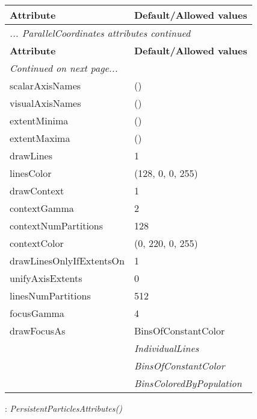\documentclass[10pt,a4paper]{report}
\begin{document}
\begin{longtable}{ll}
{\bf Attribute} & {\bf Default/Allowed values} \\
\hline \hline
\endfirsthead
\multicolumn{2}{l}{{\it ... ParallelCoordinates attributes continued}} \\
{\bf Attribute} & {\bf Default/Allowed values} \\
\hline \hline
\endhead
\hline
\multicolumn{2}{l}{{\it Continued on next page...}} \\
\endfoot
\hline
\endlastfoot

scalarAxisNames  &  () \\
visualAxisNames  &  () \\
extentMinima  &  () \\
extentMaxima  &  () \\
drawLines  &  1 \\
linesColor  &  (128, 0, 0, 255) \\
drawContext  &  1 \\
contextGamma  &  2 \\
contextNumPartitions  &  128 \\
contextColor  &  (0, 220, 0, 255) \\
drawLinesOnlyIfExtentsOn  &  1 \\
unifyAxisExtents  &  0 \\
linesNumPartitions  &  512 \\
focusGamma  &  4 \\
drawFocusAs  &  BinsOfConstantColor   \\
 & {\it  IndividualLines} \\
 & {\it  BinsOfConstantColor} \\
 & {\it  BinsColoredByPopulation} \\
\end{longtable}

\newpage

{}
: {\it PersistentParticlesAttributes() }\\[-3mm]
\end{document}
